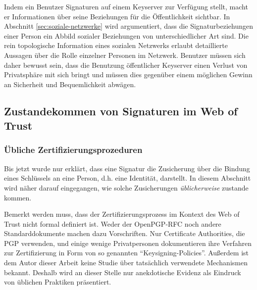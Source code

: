 Indem ein Benutzer Signaturen auf einem Keyserver zur Verfügung
stellt, macht er Informationen über seine Beziehungen für die
Öffentlichkeit sichtbar. In Abschnitt \ref{sec:soziale-netzwerke}
wird argumentiert, dass die Signaturbeziehungen einer Person ein
Abbild sozialer Beziehungen von unterschiedlicher Art sind. Die rein
topologische Information eines sozialen Netzwerks erlaubt detaillierte
Aussagen über die Rolle einzelner Personen im
Netzwerk\cite{Carrington2005}. Benutzer müssen sich daher bewusst
sein, dass die Benutzung öffentlicher Keyserver einen Verlust von
Privatsphäre mit sich bringt und müssen dies gegenüber einem
möglichen Gewinn an Sicherheit und Bequemlichkeit abwägen.

\subsection{Zustandekommen von Signaturen im Web of Trust}
\label{sec:sozi-komp-des}

\subsubsection{Übliche Zertifizierungsprozeduren}
\label{sec:ubliche-zert}

Bis jetzt wurde nur erklärt, dass eine Signatur die
Zusicherung über die Bindung eines Schlüssels an eine Person,
d.h. eine Identität, darstellt. In diesem Abschnitt wird näher
darauf eingegangen, wie solche Zusicherungen \emph{üblicherweise}
zustande kommen.

Bemerkt werden muss, dass der Zertifizierungsprozess im Kontext des
Web of Trust nicht formal definiert ist. Weder der OpenPGP-RFC noch
andere Standarddokumente machen dazu Vorschriften. Nur Certificate
Authorities, die PGP verwenden, und einige wenige Privatpersonen
dokumentieren ihre Verfahren zur Zertifizierung in Form von
so genannten ``Keysigning-Policies''. Außerdem ist dem Autor dieser
Arbeit keine Studie über tatsächlich verwendete Mechanismen
bekannt. Deshalb wird an dieser Stelle nur anekdotische Evidenz
als Eindruck von üblichen Praktiken präsentiert.

